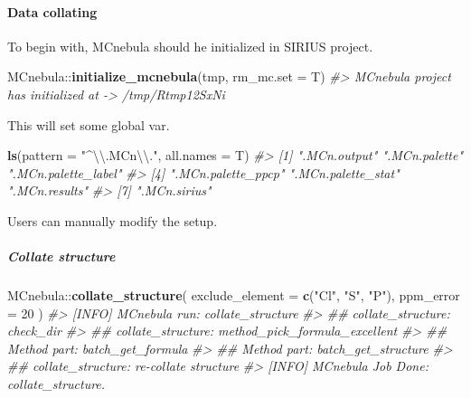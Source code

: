 \documentclass[]{tufte-handout}
\newenvironment{Shaded}{}{}
\newcommand{\CharTok}[1]{\textcolor[rgb]{0.25,0.44,0.63}{#1}}
\newcommand{\CommentTok}[1]{\textcolor[rgb]{0.38,0.63,0.69}{\textit{#1}}}
\newcommand{\DataTypeTok}[1]{\textcolor[rgb]{0.56,0.13,0.00}{#1}}
\newcommand{\DecValTok}[1]{\textcolor[rgb]{0.25,0.63,0.44}{#1}}
\newcommand{\KeywordTok}[1]{\textcolor[rgb]{0.00,0.44,0.13}{\textbf{#1}}}
\newcommand{\NormalTok}[1]{#1}
\newcommand{\OperatorTok}[1]{\textcolor[rgb]{0.40,0.40,0.40}{#1}}
\newcommand{\StringTok}[1]{\textcolor[rgb]{0.25,0.44,0.63}{#1}}
\begin{document}
\hypertarget{data-collating}{%
\paragraph{Data collating}\label{data-collating}}

To begin with, MCnebula should he initialized in SIRIUS project.

\begin{Shaded}
\begin{Highlighting}[]
\NormalTok{MCnebula}\OperatorTok{::}\KeywordTok{initialize\_mcnebula}\NormalTok{(tmp, }\DataTypeTok{rm\_mc.set =}\NormalTok{ T)}
\CommentTok{\#\textgreater{} MCnebula project has initialized at {-}\textgreater{} /tmp/Rtmp12SxNi}
\end{Highlighting}
\end{Shaded}

This will set some global var.

\begin{Shaded}
\begin{Highlighting}[]
\KeywordTok{ls}\NormalTok{(}\DataTypeTok{pattern =} \StringTok{"\^{}}\CharTok{\textbackslash{}\textbackslash{}}\StringTok{.MCn}\CharTok{\textbackslash{}\textbackslash{}}\StringTok{."}\NormalTok{, }\DataTypeTok{all.names =}\NormalTok{ T)}
\CommentTok{\#\textgreater{} [1] ".MCn.output"        ".MCn.palette"       ".MCn.palette\_label"}
\CommentTok{\#\textgreater{} [4] ".MCn.palette\_ppcp"  ".MCn.palette\_stat"  ".MCn.results"      }
\CommentTok{\#\textgreater{} [7] ".MCn.sirius"}
\end{Highlighting}
\end{Shaded}

Users can manually modify the setup.

\hypertarget{collate-structure}{%
\subparagraph{Collate structure}\label{collate-structure}}

\begin{Shaded}
\begin{Highlighting}[]
\NormalTok{MCnebula}\OperatorTok{::}\KeywordTok{collate\_structure}\NormalTok{(}
  \DataTypeTok{exclude\_element =} \KeywordTok{c}\NormalTok{(}\StringTok{"Cl"}\NormalTok{, }\StringTok{"S"}\NormalTok{, }\StringTok{"P"}\NormalTok{),}
  \DataTypeTok{ppm\_error =} \DecValTok{20}
\NormalTok{)}
\CommentTok{\#\textgreater{} [INFO] MCnebula run: collate\_structure}
\CommentTok{\#\textgreater{} \#\# collate\_structure: check\_dir}
\CommentTok{\#\textgreater{} \#\# collate\_structure: method\_pick\_formula\_excellent}
\CommentTok{\#\textgreater{} \#\# Method part: batch\_get\_formula}
\CommentTok{\#\textgreater{} \#\# Method part: batch\_get\_structure}
\CommentTok{\#\textgreater{} \#\# collate\_structure: re{-}collate structure}
\CommentTok{\#\textgreater{} [INFO] MCnebula Job Done: collate\_structure.}
\end{Highlighting}
\end{Shaded}
\end{document}

